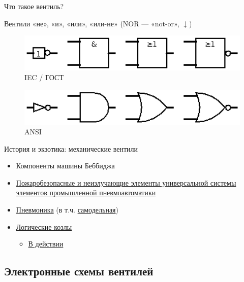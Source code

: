 \documentclass[xetex,aspectratio=43]{beamer}
\begin{document}
\begin{frame}{Что такое вентиль?}

\pause

Вентили «не», «и», «или», «или-не» (NOR --- «not-or», \(\downarrow\))

\begin{figure}
    \includegraphics[width=1\textwidth]{img/07.gates_IEC.png}
    \caption{IEC / ГОСТ}
\end{figure}


\begin{figure}
    \includegraphics[width=1\textwidth]{img/07.gates_ANSI.png}
    \caption{ANSI}
\end{figure}

\end{frame}

\begin{frame}{История и экзотика: механические вентили}
\begin{itemize}
\item
  Компоненты машины Беббиджа
\item
  \href{http://bse.sci-lib.com/particle017859.html}{Пожаробезопасные и
  неизлучающие элементы универсальной системы элементов промышленной
  пневмоавтоматики}
\item
  \href{https://habr.com/ru/company/ruvds/blog/695210/}{Пневмоника} (в т.ч. \href{https://youtu.be/yvANcR4mQ7M}{самодельная})
\item
  \href{http://www.robives.com/category/product_tags/logic_goats}{Логические
  козлы}

  \begin{itemize}
  \item
    \href{https://youtu.be/vu3o6JNclRQ}{В действии}
  \end{itemize}
\end{itemize}
\end{frame}

\subsection{Электронные схемы вентилей}
\end{document}
